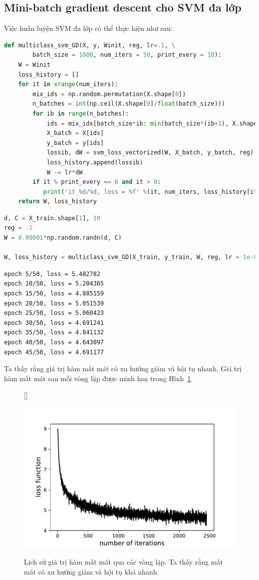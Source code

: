 \subsection{Mini-batch gradient descent cho SVM đa lớp}
 
Việc huấn luyện SVM đa lớp có thể thực hiện như sau: 
\begin{lstlisting}[language=Python]
def multiclass_svm_GD(X, y, Winit, reg, lr=.1, \
        batch_size = 1000, num_iters = 50, print_every = 10):
    W = Winit 
    loss_history = []
    for it in xrange(num_iters):
        mix_ids = np.random.permutation(X.shape[0])
        n_batches = int(np.ceil(X.shape[0]/float(batch_size)))
        for ib in range(n_batches):
            ids = mix_ids[batch_size*ib: min(batch_size*(ib+1), X.shape[0])]
            X_batch = X[ids]
            y_batch = y[ids]
            lossib, dW = svm_loss_vectorized(W, X_batch, y_batch, reg)
            loss_history.append(lossib)
            W -= lr*dW 
        if it % print_every == 0 and it > 0:
           print('it %d/%d, loss = %f' %(it, num_iters, loss_history[it]))
    return W, loss_history 
\end{lstlisting}
\begin{lstlisting}[language=Python]
d, C = X_train.shape[1], 10
reg = .1 
W = 0.00001*np.random.randn(d, C)

W, loss_history = multiclass_svm_GD(X_train, y_train, W, reg, lr = 1e-8, num_iters = 50, print_every = 5)
\end{lstlisting}
\kq 
\begin{lstlisting}
epoch 5/50, loss = 5.482782
epoch 10/50, loss = 5.204365
epoch 15/50, loss = 4.885159
epoch 20/50, loss = 5.051539
epoch 25/50, loss = 5.060423
epoch 30/50, loss = 4.691241
epoch 35/50, loss = 4.841132
epoch 40/50, loss = 4.643097
epoch 45/50, loss = 4.691177
\end{lstlisting}
Ta thấy rằng giá trị hàm mất mát có xu hướng giảm và hội tụ nhanh. Giá trị hàm mất mát sau mỗi vòng lặp được minh hoạ trong Hình~\ref{fig:22_8}.
\begin{figure}[t]
   
    [\FBwidth]
    {\caption{ 
    Lịch sử giá trị hàm mất mát qua các vòng lặp. Ta thấy rằng mất mát có xu hướng giảm và hội tụ khá nhanh.
    }
    \label{fig:22_8}}
    { %
    \includegraphics[width=.65\textwidth]{ebookML_src/src/multiclasssvm/loss_history.pdf}
    }
\end{figure}
